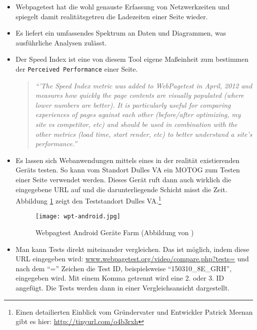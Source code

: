 			\begin{itemize}
				\item Webpagetest hat die wohl genauste Erfassung von Netzwerkzeiten und spiegelt damit realitätsgetreu die Ladezeiten einer Seite wieder.

				\item Es liefert ein umfassendes Spektrum an Daten und Diagrammen, was ausführliche Analysen zulässt.

				\item Der Speed Index ist eine von diesem Tool eigene Maßeinheit zum bestimmen der \texttt{Perceived Performance} einer Seite. 
				\begin{quote}
					\textit{"`'The Speed Index metric was added to WebPagetest in April, 2012 and measures how quickly the page contents are visually populated (where lower numbers are better).  It is particularly useful for comparing experiences of pages against each other (before/after optimizing, my site vs competitor, etc) and should be used in combination with the other metrics (load time, start render, etc) to better understand a site's performance."'}\autocite[vgl.]{webpagetestDocs}
				\end{quote}

				\item Es lassen sich Webanwendungen mittels eines in der realität existierenden Geräts testen. So kann vom Standort Dulles VA ein MOTOG zum Testen einer Seite verwendet werden. Dieses Gerät ruft dann auch wirklich die eingegebene URL auf und die darunterliegende Schicht misst die Zeit. Abbildung \ref{fig:wpt-android} zeigt den Teststandort Dulles VA.\footnote{Einen detailierten Einblick vom Gründervater und Entwickler Patrick Meenan gibt es hier: \url{http://tinyurl.com/o4b3rxh}}

				\begin{figure}[htbp]
					\begin{center}
						\texttt{[image: wpt-android.jpg]}
						\caption{Webpagtest Android Geräte Farm (Abbildung von \autocite{meenan15})}
						\label{fig:wpt-android}
					\end{center}
				\end{figure}

				\item Man kann Tests direkt miteinander vergleichen. Das ist möglich, indem diese URL eingegeben wird: \url{www.webpagetest.org/video/compare.php?tests=} und nach dem "`="' Zeichen die Test ID, beispielsweise "`150310\_8E\_GRH"', eingegeben wird.
				Mit einem Komma getrennt wird eine 2. oder 3. ID angefügt. Die Tests werden dann in einer Vergleichsansicht dargestellt.


\end{itemize}
